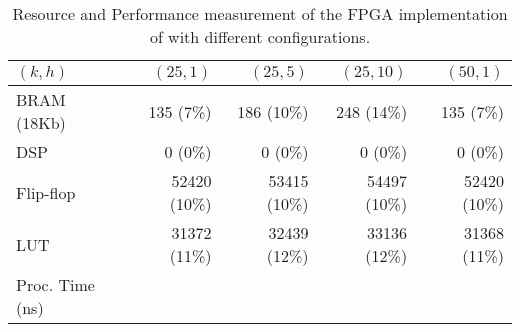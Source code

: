 \begin{table}
\begin{center}
\small
\begin{tabular}{ l r r r r } 
\toprule
$(k, h)$ & $(25, 1)$ & $(25, 5)$ & $(25,10)$ & $(50, 1)$ \\
\midrule
BRAM (18Kb) & 135 (7\%) & 186 (10\%) & 248 (14\%) & 135 (7\%) \\
DSP & 0 (0\%) & 0 (0\%) & 0 (0\%) & 0 (0\%) \\
Flip-flop & 52420 (10\%) & 53415 (10\%) & 54497 (10\%) & 52420 (10\%) \\
LUT & 31372 (11\%) & 32439 (12\%) & 33136 (12\%) & 31368 (11\%) \\
Proc. Time (ns) & \FIXME{?} & & & \\
\bottomrule
\end{tabular}
\caption{Resource and Performance measurement %
of the FPGA %
implementation of \OurSys with different configurations.}
\label{tab:microbenchmarks}
\end{center}
\end{table}

